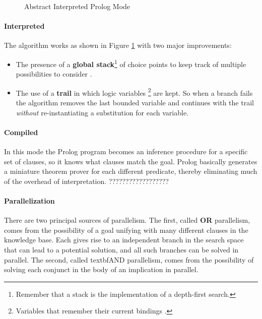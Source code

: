 \documentclass[10pt,a4paper]{article}
\begin{document}
\begin{itemize}
\begin{figure}[H]
\centering
{}
\caption{Abstract Interpreted Prolog Mode}
\label{fig:interpreted_prolog}
\end{figure}

\paragraph{Interpreted}
The algorithm works as shown in Figure \ref{fig:interpreted_prolog} with two major improvements:
\begin{itemize}
\item The presence of a \textbf{global stack}\footnote{Remember that a stack is the implementation of a depth-first search.} of choice points to keep track of multiple possibilities to consider .
\item The use of a \textbf{trail} in which logic variables \footnote{Variables that remember their current bindings .} are kept. So when a branch fails the algorithm removes the last bounded variable and continues with the trail \textit{without} re-instantiating a substitution for each variable.
\end{itemize}


\paragraph{Compiled} In this mode the Prolog program becomes  an inference procedure for a specific set of clauses, so it knows what clauses match the goal. Prolog basically generates a miniature theorem prover for each different predicate, thereby eliminating much of the overhead of interpretation. ??????????????????

\paragraph{Parallelization} There are two principal sources of parallelism. The first, called \textbf{OR} parallelism, comes from the possibility of a goal unifying with many different clauses in the knowledge base. Each gives rise to an independent branch in the search space that can lead to a potential solution, and all such branches can be solved in parallel. The second, called textbf{AND} parallelism, comes from the possibility of solving each conjunct in the body of an implication in parallel.


\end{itemize}
\end{document}
